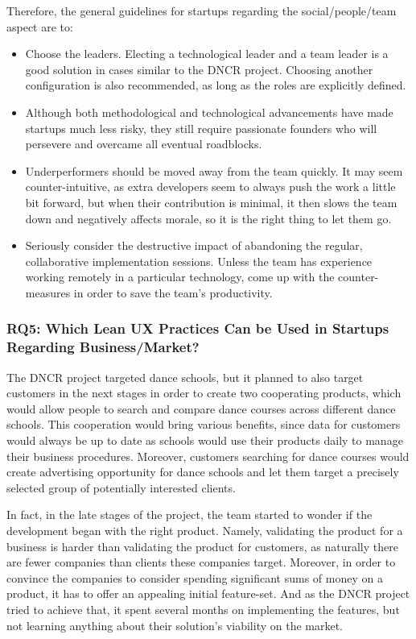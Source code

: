 \documentclass{article}
\begin{document}
Therefore, the general guidelines for startups regarding the social/people/team aspect are to:
\begin{itemize}
\item Choose the leaders. Electing a technological leader and a team leader is a good solution in cases similar to the DNCR project. Choosing another configuration is also recommended, as long as the roles are explicitly defined.
\item Although both methodological and technological advancements have made startups much less risky, they still require passionate founders who will persevere and overcame all eventual roadblocks.
\item Underperformers should be moved away from the team quickly. It may seem counter-intuitive, as extra developers seem to always push the work a little bit forward, but when their contribution is minimal, it then slows the team down and negatively affects morale, so it is the right thing to let them go.
\item Seriously consider the destructive impact of abandoning the regular, collaborative implementation sessions. Unless the team has experience working remotely in a particular technology, come up with the counter-measures in order to save the team's productivity.
\end{itemize}

\subsubsection{RQ5: Which Lean UX Practices Can be Used in Startups Regarding Business/Market?}
The DNCR project targeted dance schools, but it planned to also target customers in the next stages in order to create two cooperating products, which would allow people to search and compare dance courses across different dance schools. This cooperation would bring various benefits, since data for customers would always be up to date as schools would use their products daily to manage their business procedures. Moreover, customers searching for dance courses would create advertising opportunity for dance schools and let them target a precisely selected group of potentially interested clients.

In fact, in the late stages of the project, the team started to wonder if the development began with the right product. Namely, validating the product for a business is harder than validating the product for customers, as naturally there are fewer companies than clients these companies target. Moreover, in order to convince the companies to consider spending significant sums of money on a product, it has to offer an appealing initial feature-set. And as the DNCR project tried to achieve that, it spent several months on implementing the features, but not learning anything about their solution's viability on the market.
\end{document}
